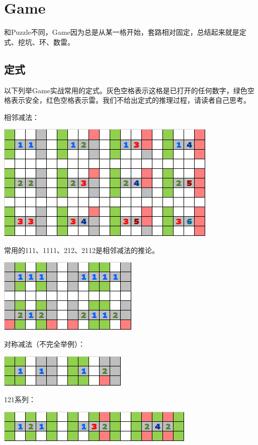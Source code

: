 \section{Game}
和Puzzle不同，Game因为总是从某一格开始，套路相对固定，总结起来就是定式、挖坑、环、数雷。

\subsection{定式}
以下列举Game实战常用的定式。灰色空格表示这格是已打开的任何数字，绿色空格表示安全，红色空格表示雷。我们不给出定式的推理过程，请读者自己思考。

\vspace{5mm}相邻减法：
\begin{center}
    \includegraphics[scale=0.6]{game/定式1.png}
\end{center}
常用的111、1111、212、2112是相邻减法的推论。
\begin{center}
    \includegraphics[scale=0.6]{game/定式6.png}
\end{center}

\vspace{5mm}对称减法（不完全举例）：
\begin{center}
    \includegraphics[scale=0.6]{game/定式2.png}
\end{center}

\vspace{5mm}121系列：
\begin{center}
    \includegraphics[scale=0.6]{game/定式3.png}
\end{center}

